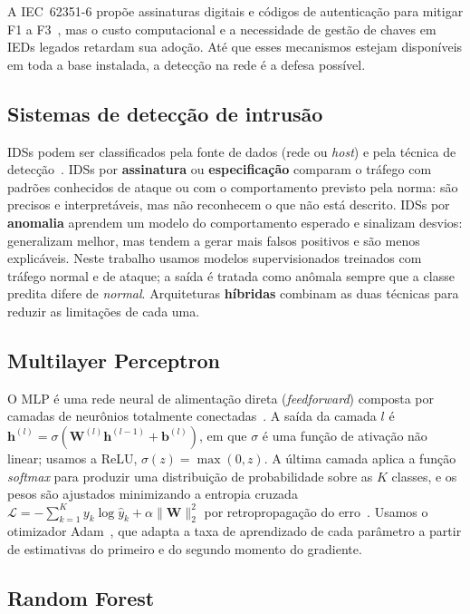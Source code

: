 \documentclass[12pt]{article}
\begin{document}
A IEC~62351-6 propõe assinaturas digitais e códigos de autenticação para
mitigar F1 a F3~\cite{iec62351-6}, mas o custo computacional e a necessidade de
gestão de chaves em IEDs legados retardam sua adoção. Até que esses mecanismos estejam
disponíveis em toda a base instalada, a detecção na rede é a defesa possível.

\subsection{Sistemas de detecção de intrusão}

IDSs podem ser classificados pela fonte de dados (rede ou \textit{host}) e
pela técnica de detecção~\cite{quincozes2021survey}. IDSs por
\textbf{assinatura} ou \textbf{especificação} comparam o tráfego com padrões
conhecidos de ataque ou com o comportamento previsto pela norma: são precisos e
interpretáveis, mas não reconhecem o que não está descrito. IDSs por
\textbf{anomalia} aprendem um modelo do comportamento esperado e sinalizam
desvios: generalizam melhor, mas tendem a gerar mais falsos positivos e são
menos explicáveis. Neste trabalho usamos modelos supervisionados treinados com
tráfego normal e de ataque; a saída é tratada como anômala sempre que a classe
predita difere de \textit{normal}. Arquiteturas \textbf{híbridas} combinam as
duas técnicas para reduzir as limitações de cada uma.

\subsection{Multilayer Perceptron}

O MLP é uma rede neural de alimentação direta (\textit{feedforward}) composta por camadas de neurônios
totalmente conectadas~\cite{haykin2009neural}. A saída da camada $l$ é
$\mathbf{h}^{(l)} = \sigma(\mathbf{W}^{(l)}\mathbf{h}^{(l-1)} + \mathbf{b}^{(l)})$,
em que $\sigma$ é uma função de ativação não linear; usamos a ReLU,
$\sigma(z)=\max(0,z)$. A última camada aplica a função \textit{softmax} para
produzir uma distribuição de probabilidade sobre as $K$ classes, e os pesos são
ajustados minimizando a entropia cruzada
$\mathcal{L} = -\sum_{k=1}^{K} y_k \log \hat{y}_k + \alpha\|\mathbf{W}\|_2^2$
por retropropagação do erro~\cite{rumelhart1986learning}. Usamos o otimizador
Adam~\cite{kingma2015adam}, que adapta a taxa de aprendizado de cada parâmetro a
partir de estimativas do primeiro e do segundo momento do gradiente.

\subsection{Random Forest}
\end{document}
